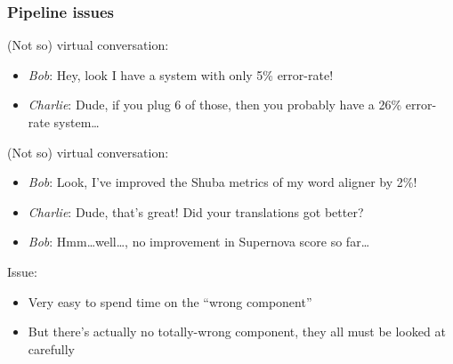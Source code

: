 \documentclass[usenames,dvipsnames]{beamer}
\begin{document}
\begin{frame}\frametitle{Pipeline issues}

(Not so) virtual conversation:
\begin{itemize}
\item \emph{Bob}: Hey, look I have a system with only 5\% error-rate!
\item \emph{Charlie}: Dude, if you plug 6 of those, then you probably have a
  26\% error-rate system\ldots
\end{itemize}

\vspace{0.4cm}
(Not so) virtual conversation:
\begin{itemize}
\item \emph{Bob}: Look, I've improved the Shuba metrics of my word
  aligner by 2\%!
\item \emph{Charlie}: Dude, that's great!  Did your translations got better?
\item \emph{Bob}: Hmm\dots well\dots, no improvement in Supernova
  score so far\dots
\end{itemize}

\pause
\vspace{0.4cm}
Issue:
\begin{itemize}
\item Very easy to spend time on the ``wrong component''
\item But there's actually no totally-wrong component, they all must
  be looked at carefully
\end{itemize}

\end{frame}







\end{document}
